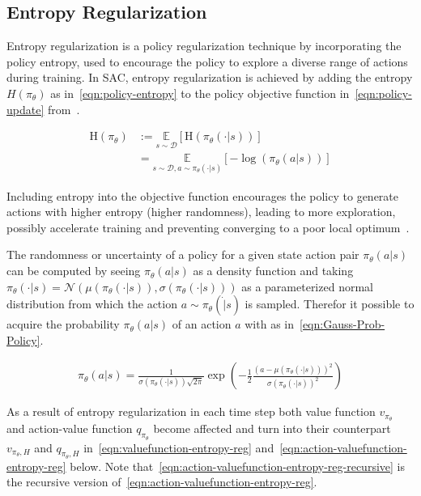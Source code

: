\subsection{Entropy Regularization}\label{sec:entropy-regularization}

Entropy regularization is a policy regularization technique by incorporating the policy entropy, used to encourage the policy to explore a diverse range of actions during training. In SAC, entropy regularization is achieved by adding the entropy $H(\pi_\theta)$ as in~\eqref{eqn:policy-entropy} to the policy objective function in~\eqref{eqn:policy-update} from~\cite{SuttonBartoRLBook}.

\begin{align}\label{eqn:policy-entropy}
    \mathrm{H}(\pi_\theta) &:= \underset{s\sim \mathcal{D}}{\mathbb{E}}\left[\mathrm{H}(\pi_\theta(\cdot|s))\right] \nonumber\\
    &=\underset{s\sim\mathcal{D}, a\sim\pi_\theta(\cdot|s)}{\mathbb{E}}\left[- \log(\pi_\theta(a|s))\right]
\end{align} 

Including entropy into the objective function encourages the policy to generate actions with higher entropy (higher randomness), leading to more exploration, possibly accelerate training and preventing converging to a poor local optimum~\cite{SpinningUp2018}.

The randomness or uncertainty of a policy for a given state action pair $\pi_\theta(a|s)$ can be computed  by seeing  $\pi_\theta(a|s)$ as a density function and taking $\pi_\theta(\cdot|s) = \mathcal{N}\left(\mu(\pi_\theta(\cdot|s)), \sigma(\pi_\theta(\cdot|s))\right)$ as a parameterized normal distribution from which the action $a \sim \pi_\theta(\dot|s)$ is sampled. Therefor it possible to acquire the probability $\pi_\theta(a|s)$ of an action $a$ with as in~\eqref{eqn:Gauss-Prob-Policy}.

\begin{align}
	\pi_\theta(a|s) = \frac{1}{\sigma(\pi_\theta(\cdot|s)) \sqrt{2\pi}} \exp\left(-\frac{1}{2}\frac{(a -\mu(\pi_\theta(\cdot|s)))^2}{\sigma(\pi_\theta(\cdot|s))^2}\right) \label{eqn:Gauss-Prob-Policy}
\end{align}

As a result of entropy regularization in each time step both value function $v_{\pi_\theta}$ and action-value function $q_{\pi_\theta}$ become affected and turn into their counterpart $v_{\pi_\theta, H}$ and $q_{\pi_\theta, H}$ in~\eqref{eqn:valuefunction-entropy-reg} and~\eqref{eqn:action-valuefunction-entropy-reg} below.  Note that~\eqref{eqn:action-valuefunction-entropy-reg-recursive} is the recursive version of~\eqref{eqn:action-valuefunction-entropy-reg}.


